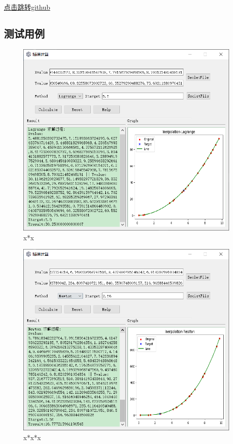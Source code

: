 \documentclass[UTF8]{ctexart}
\begin{document}
        \href{https://github.com/hxhcreate/numerical-analysis-work/tree/master}{点击跳转github}
        \subsection{测试用例}
            \begin{figure}[htb]
                \centering
                \includegraphics[scale = 0.6]{xx.png}
                \caption{x*x}  
                \label{fig:测试1}
            \end{figure}
            \begin{figure}[htb]
                \centering
                \includegraphics[scale = 0.6]{xxx.png}
                \caption{x*x*x}
                \label{fig:测试2}
            \end{figure}
\end{document}

